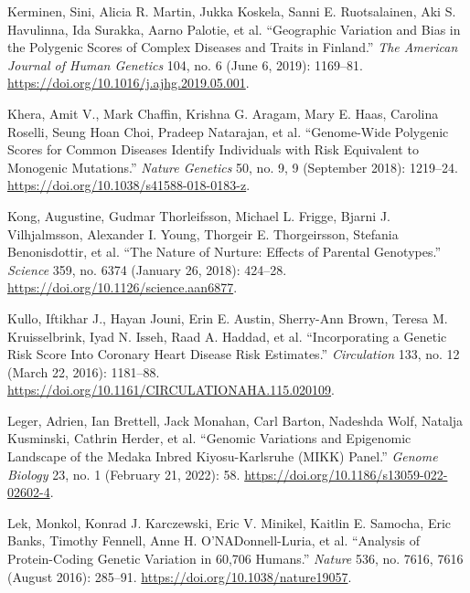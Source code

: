 \documentclass[
]{book}
\newlength{\cslhangindent}
\newlength{\cslentryspacingunit} %
\newenvironment{CSLReferences}[2] %
 {%
  \setlength{\parindent}{0pt}
  \ifodd #1
  \let\oldpar\par
  \def\par{\hangindent=\cslhangindent\oldpar}
  \fi
  \setlength{\parskip}{#2\cslentryspacingunit}
 }%
 {}
\begin{document}
\begin{CSLReferences}{1}{0}
\leavevmode{}%
Kerminen, Sini, Alicia R. Martin, Jukka Koskela, Sanni E. Ruotsalainen, Aki S. Havulinna, Ida Surakka, Aarno Palotie, et al. {``Geographic {Variation} and {Bias} in the {Polygenic Scores} of {Complex Diseases} and {Traits} in {Finland}.''} \emph{The American Journal of Human Genetics} 104, no. 6 (June 6, 2019): 1169--81. \url{https://doi.org/10.1016/j.ajhg.2019.05.001}.

\leavevmode{}%
Khera, Amit V., Mark Chaffin, Krishna G. Aragam, Mary E. Haas, Carolina Roselli, Seung Hoan Choi, Pradeep Natarajan, et al. {``Genome-Wide Polygenic Scores for Common Diseases Identify Individuals with Risk Equivalent to Monogenic Mutations.''} \emph{Nature Genetics} 50, no. 9, 9 (September 2018): 1219--24. \url{https://doi.org/10.1038/s41588-018-0183-z}.

\leavevmode{}%
Kong, Augustine, Gudmar Thorleifsson, Michael L. Frigge, Bjarni J. Vilhjalmsson, Alexander I. Young, Thorgeir E. Thorgeirsson, Stefania Benonisdottir, et al. {``The Nature of Nurture: {Effects} of Parental Genotypes.''} \emph{Science} 359, no. 6374 (January 26, 2018): 424--28. \url{https://doi.org/10.1126/science.aan6877}.

\leavevmode{}%
Kullo, Iftikhar J., Hayan Jouni, Erin E. Austin, Sherry-Ann Brown, Teresa M. Kruisselbrink, Iyad N. Isseh, Raad A. Haddad, et al. {``Incorporating a {Genetic Risk Score Into Coronary Heart Disease Risk Estimates}.''} \emph{Circulation} 133, no. 12 (March 22, 2016): 1181--88. \url{https://doi.org/10.1161/CIRCULATIONAHA.115.020109}.

\leavevmode{}%
Leger, Adrien, Ian Brettell, Jack Monahan, Carl Barton, Nadeshda Wolf, Natalja Kusminski, Cathrin Herder, et al. {``Genomic Variations and Epigenomic Landscape of the {Medaka Inbred Kiyosu-Karlsruhe} ({MIKK}) Panel.''} \emph{Genome Biology} 23, no. 1 (February 21, 2022): 58. \url{https://doi.org/10.1186/s13059-022-02602-4}.

\leavevmode{}%
Lek, Monkol, Konrad J. Karczewski, Eric V. Minikel, Kaitlin E. Samocha, Eric Banks, Timothy Fennell, Anne H. O'NADonnell-Luria, et al. {``Analysis of Protein-Coding Genetic Variation in 60,706 Humans.''} \emph{Nature} 536, no. 7616, 7616 (August 2016): 285--91. \url{https://doi.org/10.1038/nature19057}.


\end{CSLReferences}
\end{document}
